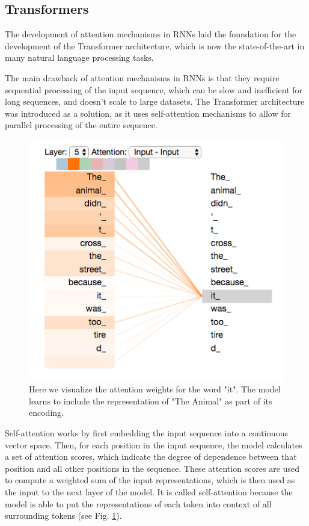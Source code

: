 \subsection{Transformers}
The development of attention mechanisms in RNNs laid the foundation for the development of the Transformer architecture, which is now the state-of-the-art in many natural language processing tasks.

The main drawback of attention mechanisms in RNNs is that they require sequential processing of the input sequence, which can be slow and inefficient for long sequences, and doesn't scale to large datasets.
The Transformer architecture was introduced as a solution, as it uses self-attention mechanisms to allow for parallel processing of the entire sequence.

\begin{figure}[h]
    \includegraphics[width=\linewidth]{chapters/NLP/figures/self-attention.png}
    \caption{Here we visualize the attention weights for the word "it". The model learns to include the representation of "The Animal" as part of its encoding.}
    \label{fig:self-attention}
\end{figure}

Self-attention works by first embedding the input sequence into a continuous vector space. Then, for each position in the input sequence, the model calculates a set of attention scores, which indicate the degree of dependence between that position and all other positions in the sequence. These attention scores are used to compute a weighted sum of the input representations, which is then used as the input to the next layer of the model.
It is called self-attention because the model is able to put the representations of each token into context of all surrounding tokens (see Fig. \ref{fig:self-attention}).


